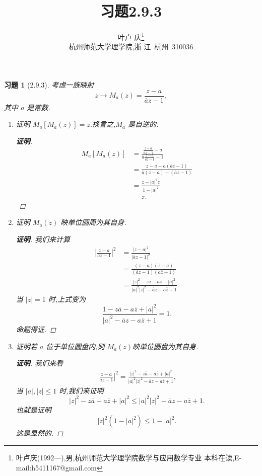\documentclass[a4paper]{article}
\newtheorem*{exercise}{习题}
\begin{document}
\title{\huge{\bf{习题2.9.3}}} \author{\small{叶卢
    庆\footnote{叶卢庆(1992---),男,杭州师范大学理学院数学与应用数学专业
      本科在读,E-mail:h5411167@gmail.com}}\\{\small{杭州师范大学理学院,浙
      江~杭州~310036}}}
\maketitle
\begin{exercise}[2.9.3]
考虑一族映射
$$
z\to M_a(z)=\frac{z-a}{\overline{a}z-1},
$$
其中 $a$ 是常数.
\begin{enumerate}
\item 证明 $M_a[M_a(z)]=z$.换言之,$M_a$ 是自逆的.

\begin{proof}[\textbf{证明}]
  \begin{align*}
    M_a[M_a(z)]&=\frac{\frac{z-a}{\overline{a}z-1}-a}{\overline{a}\frac{z-a}{\overline{a}z-1}-1}\\&=\frac{z-a-a(\overline{a}z-1)}{\overline{a}(z-a)-(\overline{a}z-1)}\\&=\frac{z-|a|^2z}{1-|a|^2}\\&=z.
  \end{align*}
\end{proof}
\item 证明 $M_a(z)$ 映单位圆周为其自身.
  \begin{proof}[\textbf{证明}]
我们来计算
\begin{align*}
  \left| \frac{z-a}{\overline{a}z-1}\right|^{2}&=\frac{|z-a|^{2}}{|\overline{a}z-1|^{2}}\\&=\frac{(z-a)(\overline{z}-\overline{a})}{(\overline{a}z-1)(a\overline{z}-1)}\\&=\frac{|z|^2-z\overline{a}-a\overline{z}+|a|^2}{|a|^2|z|^2-\overline{a}z-a\overline{z}+1}.
\end{align*}
当 $|z|=1$ 时,上式变为
$$
\frac{1-z\overline{a}-a\overline{z}+|a|^2}{|a|^2-\overline{a}z-a\overline{z}+1}=1.
$$
命题得证.
  \end{proof}
  \item 证明若 $a$ 位于单位圆盘内,则 $M_a(z)$映单位圆盘为其自身.
  \begin{proof}[\textbf{证明}]
  我们来看
  \begin{align*}
    \left|\frac{z-a}{\overline{a}z-1}\right|^2=\frac{|z|^2-z\overline{a}-a\overline{z}+|a|^2}{|a|^2|z|^2-\overline{a}z-a\overline{z}+1},
  \end{align*}
当 $|a|,|z|\leq 1$ 时,我们来证明
$$
|z|^2-z\overline{a}-a\overline{z}+|a|^2\leq |a|^2|z|^2-\overline{a}z-a\overline{z}+1.
$$
也就是证明
$$
|z|^2(1-|a|^2)\leq 1-|a|^2.
$$
这是显然的.
  \end{proof}
\end{enumerate}
\end{exercise}
\end{document}
